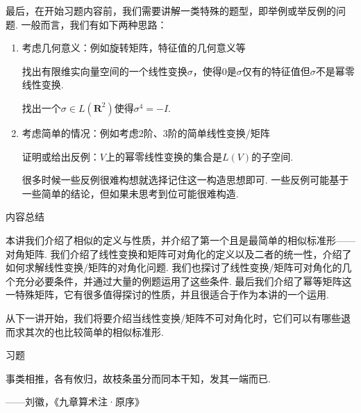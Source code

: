 \begin{solution}

\end{solution}

最后，在开始习题内容前，我们需要讲解一类特殊的题型，即举例或举反例的问题. 一般而言，我们有如下两种思路：
\begin{enumerate}
    \item 考虑几何意义：例如旋转矩阵，特征值的几何意义等
          \begin{example}
              找出有限维实向量空间的一个线性变换$\sigma$，使得0是$\sigma$仅有的特征值但$\sigma$不是幂零线性变换.
          \end{example}
          \begin{example}
              找出一个$\sigma\in L(\mathbf{R}^2)$使得$\sigma^4=-I$.
          \end{example}

    \item 考虑简单的情况：例如考虑2阶、3阶的简单线性变换/矩阵
          \begin{example}
              证明或给出反例：$V$上的幂零线性变换的集合是$L(V)$的子空间.
          \end{example}
          很多时候一些反例很难构想就选择记住这一构造思想即可. 一些反例可能基于一些简单的结论，但如果未思考到位可能很难构造.
\end{enumerate}

\vspace{2ex}
\centerline{\heiti \Large 内容总结}

本讲我们介绍了相似的定义与性质，并介绍了第一个且是最简单的相似标准形——对角矩阵. 我们介绍了线性变换和矩阵可对角化的定义以及二者的统一性，介绍了如何求解线性变换/矩阵的对角化问题. 我们也探讨了线性变换/矩阵可对角化的几个充分必要条件，并通过大量的例题运用了这些条件. 最后我们介绍了幂等矩阵这一特殊矩阵，它有很多值得探讨的性质，并且很适合于作为本讲的一个运用.

从下一讲开始，我们将要介绍当线性变换/矩阵不可对角化时，它们可以有哪些退而求其次的也比较简单的相似标准形.

\vspace{2ex}
\centerline{\heiti \Large 习题}

\vspace{2ex}
{\kaishu 事类相推，各有攸归，故枝条虽分而同本干知，发其一端而已.}
\begin{flushright}
    \kaishu
    ——刘徽，《九章算术注·原序》
\end{flushright}

